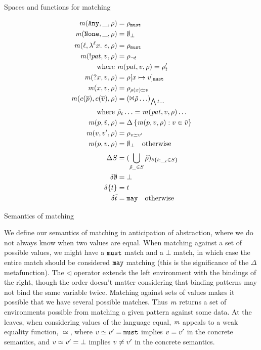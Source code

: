   {\caption{Spaces and functions for matching}\label{fig:matchspace}}
  {\begin{align*}
    \matches(\sany, \_, \menv) &= \menv_\must \\
    \matches(\snone, \_, \menv) &= \emptyset_\bot \\
    \matches(\mtoplevelname, \snlam{\mtoplevelname}{\mvar}{\mexp}, \menv) &= \menv_\must \\
    \matches(\snegpat{\mvpat}, \mdata, \menv) &= \menv_{\neg \mvaluation} \\
    \text{where }& \matches(\mvpat, \mdata, \menv) = \menv'_\mvaluation \\
    \matches(\sbind{\mvar}, \mdata, \menv) &= \menv[\mvar \mapsto \mdata]_\must \\
    \matches(\mvar, \mdata, \menv) &= \menv_{\menv(\mvar) \simeq \mdata} \\
    \matches(\mconstructor(\many{\mpat}), \mconstructor(\many{\mdata}), \menv) &= (\Bowtie \menvs \ldots)_{\bigwedge \mvaluation \ldots} \\
    \text{where }& \menvs_\mvaluation \ldots = \matches(\mvpat, \mdata, \menv) \ldots \\
    \matches(\mpat, \isset{\mdata}, \menv) &= \Delta\setbuild{\matches(\mpat, \mdata, \menv)}{\mdata \in \isset{\mdata}} \\
    \matches(\mdata, \mdata', \menv) &= \menv_{\mdata \simeq \mdata'} \\
    \matches(\mpat, \mdata, \menv) &= \emptyset_\bot \quad
    \text{otherwise}
    \\[2pt]
    \Delta S &= (\bigcup\limits_{\menvs_{\_} \in S}\menvs)_{\delta \setbuild{\mvaluation}{{\_}_\mvaluation \in S}} \\
    \delta \emptyset &= \bot \\
    \delta \setof{\mvaluation} &= \mvaluation \\
    \delta \isset{t} &= \may \quad \text{otherwise}
  \end{align*}}{\caption{Semantics of matching}\label{fig:matchsem}}

We define our semantics of matching in anticipation of abstraction, where we do not always know when two values are equal.
%
When matching against a set of possible values, we might have a ${\tt must}$ match and a $\bot$ match, in which case the entire match should be considered ${\tt may}$ matching (this is the significance of the $\Delta$ metafunction).
%
The $\triangleleft$ operator extends the left environment with the bindings of the right, though the order doesn't matter considering that binding patterns may not bind the same variable twice.
%
Matching against sets of values makes it possible that we have several possible matches.
%
Thus $\mathit{m}$ returns a set of environments possible from matching a given pattern against some data.
%
At the leaves, when considering values of the language equal, $\mathit{m}$ appeals to a weak equality function, $\simeq$, where $v \simeq v' = {\tt must}$ implies $v = v'$ in the concrete semantics, and $v \simeq v' = \bot$ implies $v \neq v'$ in the concrete semantics.

